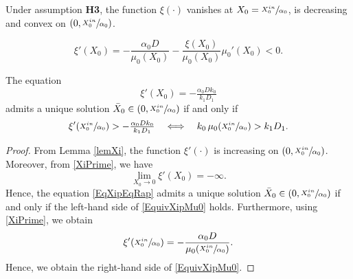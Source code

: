 \documentclass[10pt,a4paper]{amsart}
\begin{document}
\begin{lemma}                    \label{lemXi}
Under assumption {\bf H3}, the function $\xi(\cdot)$ vanishes at 
$X_0=\sfrac{X_0^{in}}{\alpha_0}$, is decreasing and convex on 
$\left(0,\sfrac{X_0^{in}}{\alpha_0}\right)$.
\end{lemma}

\begin{equation}               \label{XiPrime}
\xi'(X_0)=-\frac{\alpha_0 D}{\mu_0(X_0)}-\frac{\xi(X_0)}{\mu_0(X_0)}\mu_0'(X_0)<0.
\end{equation}

\begin{lemma}                   \label{lemXi2}
The equation 
\begin{equation}            \label{EqXipEqRap}
\xi'(X_0)=-\tfrac{\alpha_0 D k_0}{k_1 D_1}
\end{equation}
admits a unique solution 
$\bar X_0 \in \left(0,\sfrac{X_0^{in}}{\alpha_0}\right)$
if and only if
\begin{equation}            \label{EquivXipMu0}
\xi'\!\left(\sfrac{X_0^{in}}{\alpha_0}\right) > -\tfrac{\alpha_0 D k_0}{k_1 D_1}
\quad \Longleftrightarrow \quad
k_0 \, \mu_0\!\left(\sfrac{X_0^{in}}{\alpha_0}\right) > k_1 D_1.
\end{equation}
\end{lemma}

\begin{proof}
From Lemma \ref{lemXi}, the function $\xi'(\cdot)$ is  increasing on 
$\left(0,\sfrac{X_0^{in}}{\alpha_0}\right)$. 
Moreover, from \eqref{XiPrime}, we have
\[
\lim_{X_0\to 0} \xi'(X_0) = -\infty.
\]
Hence, the equation \eqref{EqXipEqRap} admits a unique solution 
$\bar X_0 \in \left(0,\sfrac{X_0^{in}}{\alpha_0}\right)$
if and only if the left-hand side of \eqref{EquivXipMu0} holds.
Furthermore, using \eqref{XiPrime}, we obtain
\[
\xi'\!\left(\sfrac{X_0^{in}}{\alpha_0}\right) 
= -\frac{\alpha_0 D}{\mu_0\!\left(\sfrac{X_0^{in}}{\alpha_0}\right)}.
\]
Hence, we obtain the right-hand side of \eqref{EquivXipMu0}.
\end{proof}
\end{document}

